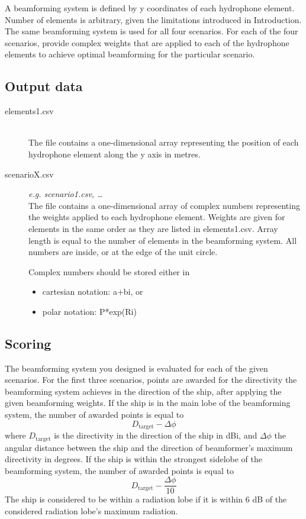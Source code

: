 \documentclass{article}[a4paper]
\begin{document}
A beamforming system is defined by y coordinates of each hydrophone element. Number of elements is arbitrary, given the limitations introduced in Introduction. The same beamforming system is used for all four scenarios. For each of the four scenarios, provide complex weights that are applied to each of the hydrophone elements to achieve optimal beamforming for the particular scenario.

\subsection*{Output data}

\begin{description}
	\item[elements1.csv] \,\\ The file contains a one-dimensional array representing the position of each hydrophone element along the y axis in metres.
	
	\item[scenarioX.csv] \textit{e.g. scenario1.csv, \ldots}\,\\ The file contains a one-dimensional array of complex numbers representing the weights applied to each hydrophone element. Weights are given for elements in the same order as they are listed in \textsf{elements1.csv}. Array length is equal to the number of elements in the beamforming system. All numbers are inside, or at the edge of the unit circle.
	
	Complex numbers should be stored either in
	\begin{itemize}
		\item cartesian notation: \textsf{a+bi}, or
		\item polar notation: \textsf{P*exp(Ri)}
	\end{itemize}
\end{description}


\subsection*{Scoring}

The beamforming system you designed is evaluated for each of the given scenarios. For the first three scenarios, points are awarded for the directivity the beamforming system achieves in the direction of the ship, after applying the given beamforming weights. If the ship is in the main lobe of the beamforming system, the number of awarded points is equal to
\[ D_\textrm{target} - \varDelta \phi \]
where $D_\textrm{target}$ is the directivity in the direction of the ship in dBi, and $\varDelta \phi$ the angular distance between the ship and the direction of beamformer's maximum directivity in degrees. If the ship is within the strongest sidelobe of the beamforming system, the number of awarded points is equal to
\[ D_\textrm{target} - \dfrac{\varDelta \phi}{10} \]
The ship is considered to be within a radiation lobe if it is within 6 dB of the considered radiation lobe's maximum radiation.
\end{document}
